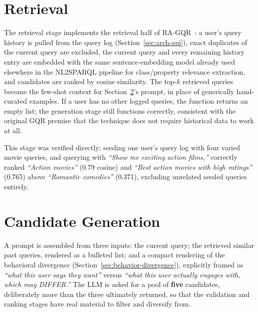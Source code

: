 \documentclass[11pt,a4paper,oneside]{book}
\begin{document}
\section{Retrieval}
\label{sec:rec-retrieval}

The retrieval stage implements the retrieval half of RA-GQR~\cite{bacciu2024}: a user's query
history is pulled from the query log (Section~\ref{sec:arch-api}), exact duplicates of the current
query are excluded, the current query and every remaining history entry are embedded with the same
sentence-embedding model already used elsewhere in the NL2SPARQL pipeline for class/property
relevance extraction, and candidates are ranked by cosine similarity. The top-$k$ retrieved queries
become the few-shot context for Section~\ref{sec:rec-generation}'s prompt, in place of generically
hand-curated examples. If a user has no other logged queries, the function returns an empty list;
the generation stage still functions correctly, consistent with the original GQR premise that the
technique does not require historical data to work at all.

This stage was verified directly: seeding one user's query log with four varied movie queries, and
querying with \emph{``Show me exciting action films,''} correctly ranked \emph{``Action movies''}
(0.79 cosine) and \emph{``Best action movies with high ratings''} (0.765) above \emph{``Romantic
comedies''} (0.371), excluding unrelated seeded queries entirely.

\section{Candidate Generation}
\label{sec:rec-generation}

A prompt is assembled from three inputs: the current query; the retrieved similar past queries,
rendered as a bulleted list; and a compact rendering of the behavioral divergence
(Section~\ref{sec:behavior-divergence}), explicitly framed as \emph{``what this user says they
want''} versus \emph{``what this user actually engages with, which may DIFFER.''} The LLM is asked
for a pool of \textbf{five} candidates, deliberately more than the three ultimately returned, so
that the validation and ranking stages have real material to filter and diversify from.
\end{document}
